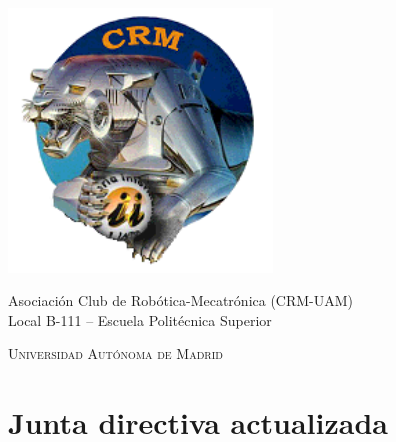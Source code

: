 \documentclass[12pt,twoside]{report}
\begin{document}
\begin{titlepage}
\includegraphics[width = 7cm]{fotos/logo_crm-192x192.png}

{\large Asociación Club de Robótica-Mecatrónica (CRM-UAM)} \\
Local B-111 -- Escuela Politécnica Superior

\vfill

\textsc{\Large Universidad Autónoma de Madrid}\\[0.5cm]

\vfill



\makeatletter
{ \Large \@date }
\vfill
\makeatother


\end{titlepage}

\clearpage{\pagestyle{empty}\cleardoublepage}


\setcounter{page}{1}
\pagestyle{fancy}






\begin{spacing}{0.1}
\tableofcontents
\end{spacing}

\clearpage{\pagestyle{empty}\cleardoublepage}

\setcounter{page}{1}

\fancyhead[LE,RO]{\slshape}
\fancyhead[LO,RE]{\slshape \leftmark}




\chapter{Junta directiva actualizada}
\end{document}
